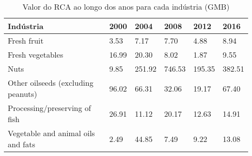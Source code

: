 \begin{table}
\centering
\caption{Valor do RCA ao longo dos anos para cada indústria (GMB)}
\label{tab:ex3-tempo-GMB}
\begin{tabular}{p{6cm}p{1.5cm}p{1.5cm}p{1.5cm}p{1.5cm}p{1.5cm}}
\toprule
                         Indústria &  2000 &   2004 &   2008 &   2012 &   2016 \\
\midrule
                       Fresh fruit &  3.53 &   7.17 &   7.70 &   4.88 &   8.94 \\
                  Fresh vegetables & 16.99 &  20.30 &   8.02 &   1.87 &   9.55 \\
                              Nuts &  9.85 & 251.92 & 746.53 & 195.35 & 382.51 \\
Other oilseeds (excluding peanuts) & 96.02 &  66.31 &  32.06 &  19.17 &  67.40 \\
     Processing/preserving of fish & 26.91 &  11.12 &  20.17 &  12.63 &  14.91 \\
Vegetable and animal oils and fats &  2.49 &  44.85 &   7.49 &   9.22 &  13.08 \\
\bottomrule
\end{tabular}
\end{table}
